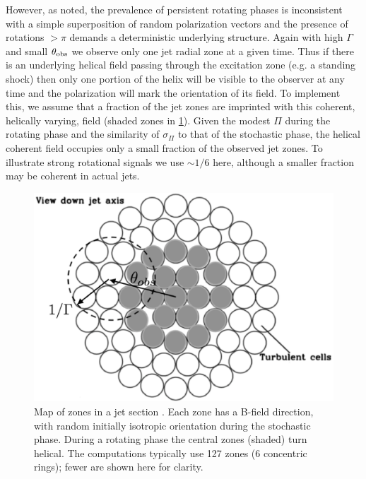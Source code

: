 However, as noted, the prevalence of persistent rotating phases is inconsistent with a simple superposition of random polarization vectors \citep{blinov_robopol_2016} and the presence of rotations $>\pi$ demands a deterministic underlying structure. Again with high $\Gamma$ and small $\theta_{\rm obs}$ we observe only one jet radial zone at a given time. Thus if there is an underlying helical field passing through the excitation zone (e.g. a standing shock) then only one portion of the helix will be visible to the observer at any time and the polarization will mark the orientation of its field. To implement this, we assume that a fraction of the jet zones are imprinted with this coherent, helically varying, field (shaded zones in \cref{fig:f5}). Given the modest $\Pi$ during the rotating phase and the similarity of $\sigma_\Pi$ to that of the stochastic phase, the helical coherent field occupies only a small fraction of the observed jet zones. To illustrate strong rotational signals we use $\sim 1/6$ here, although a smaller fraction may be coherent in actual jets.
    
\begin{figure}[t]
\label{fig:f5}
\includegraphics[width=0.8\linewidth]{figures/f5.eps}
\centering
\caption{Map of zones in a jet section \citep{marscher_turbulent_2014}. Each zone has a B-field direction, with random initially isotropic orientation during the stochastic phase. During a rotating phase the central zones (shaded) turn helical. The computations typically use 127 zones (6 concentric rings); fewer are shown here for clarity.}
\end{figure}

